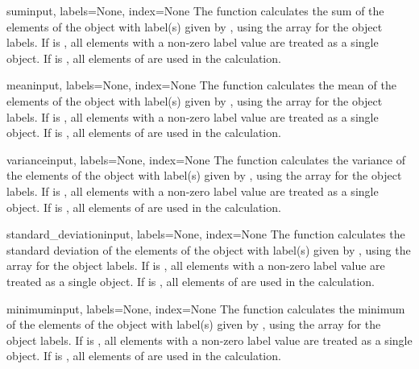 \begin{funcdesc}{sum}{input, labels=None, index=None}
  The  function calculates the sum of the elements of the 
  object with label(s) given by , using the  array 
  for the object labels. If  is , all elements 
  with a non-zero label value are treated as a single object. If 
   is , all elements of  are used in 
  the calculation.
\end{funcdesc}

\begin{funcdesc}{mean}{input, labels=None, index=None}
  The  function calculates the mean of the elements of the
  object with label(s) given by , using the  array 
  for the object labels. If  is , all elements 
  with a non-zero label value are treated as a single object. If 
   is , all elements of  are used in 
  the calculation.
\end{funcdesc}

\begin{funcdesc}{variance}{input, labels=None, index=None}
  The  function calculates the variance of the elements 
  of the object with label(s) given by , using the  
  array for the object labels. If  is , all 
  elements with a non-zero label value are treated as a single object. If 
   is , all elements of  are used in 
  the calculation.
\end{funcdesc}

\begin{funcdesc}{standard_deviation}{input, labels=None, index=None}
  The  function calculates the standard 
  deviation of the elements of the object with label(s) given by 
  , using the  array for the object labels. If 
   is , all elements with a non-zero label value 
  are treated as a single object. If  is , all 
  elements of  are used in the calculation.
\end{funcdesc}

\begin{funcdesc}{minimum}{input, labels=None, index=None}
  The  function calculates the minimum of the elements of 
  the object with label(s) given by , using the  
  array for the object labels. If  is , all 
  elements with a non-zero label value are treated as a single object. If 
   is , all elements of  are used in 
  the calculation.
\end{funcdesc}

